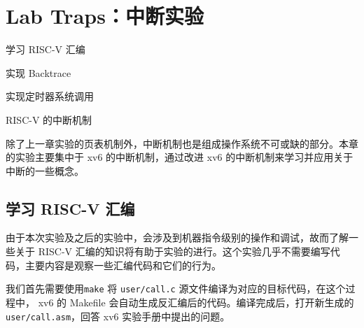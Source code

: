 \chapter{Lab Traps：中断实验}
\begin{introduction}
    \item 学习 RISC-V 汇编
    \item 实现 Backtrace 
    \item 实现定时器系统调用
    \item RISC-V 的中断机制
\end{introduction}

除了上一章实验的页表机制外，中断机制也是组成操作系统不可或缺的部分。本章的实验主要集中于 xv6 的中断机制，通过改进 xv6 的中断机制来学习并应用关于中断的一些概念。

\section{学习 RISC-V 汇编}

由于本次实验及之后的实验中，会涉及到机器指令级别的操作和调试，故而了解一些关于 RISC-V 汇编的知识将有助于实验的进行。这个实验几乎不需要编写代码，主要内容是观察一些汇编代码和它们的行为。

我们首先需要使用\lstinline{make} 将 \lstinline{user/call.c} 源文件编译为对应的目标代码，在这个过程中， xv6 的 Makefile 会自动生成反汇编后的代码。编译完成后，打开新生成的 \lstinline{user/call.asm}，回答 xv6 实验手册中提出的问题。

